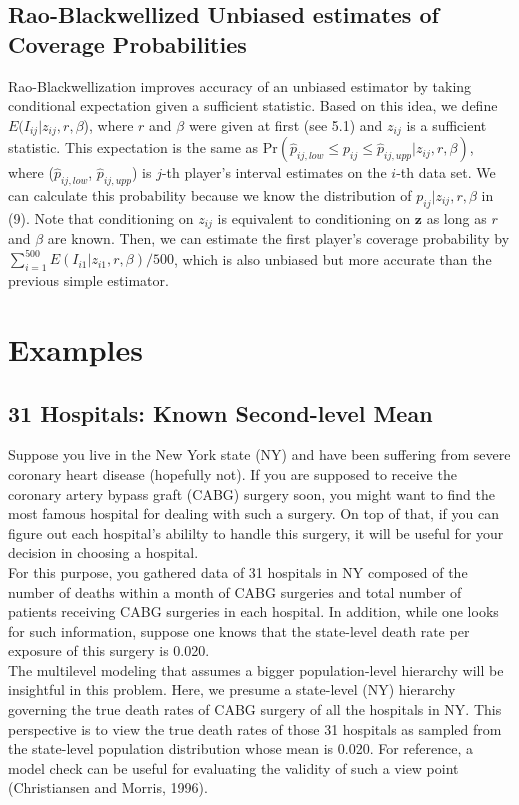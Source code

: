 \documentclass[article]{jss}
\begin{document}
\subsection{Rao-Blackwellized Unbiased estimates of Coverage Probabilities}
Rao-Blackwellization improves accuracy of an unbiased estimator by taking conditional expectation given a sufficient statistic. Based on this idea, we define $E(I_{ij}\vert z_{ij}, r, \beta$), where $r$ and $\beta$ were given at first (see 5.1) and $z_{ij}$ is a sufficient statistic. This expectation is the same as Pr$(\hat{p}_{ij, low}\le p_{ij} \le\hat{p}_{ij, upp}\vert z_{ij}, r, \beta)$, where ($\hat{p}_{ij, low}$, $\hat{p}_{ij, upp}$) is $j$-th player's interval estimates on the $i$-th data set. We can calculate this probability  because we know the distribution of $p_{ij} \vert z_{ij}, r, \beta$ in (9). Note that conditioning on $z_{ij}$ is equivalent to conditioning on $\mathbf{z}$ as long as $r$ and $\beta$ are known. Then, we can estimate the first player's coverage probability by $\sum_{i=1}^{500}E(I_{i1}\vert z_{i1}, r, \beta)/500$, which is also unbiased but more accurate than the previous simple estimator.

\section[Examples]{Examples}
\subsection[Known Second-level Mean]{31 Hospitals: Known Second-level Mean}
Suppose you live in the New York state (NY) and have been suffering from severe coronary heart disease (hopefully not). If you are supposed to receive the coronary artery bypass graft (CABG) surgery soon, you might want to find the most famous hospital for dealing with such a surgery. On top of that, if you can figure out each hospital's abililty to handle this surgery, it will be useful for your decision in choosing a hospital.
\\

For this purpose, you gathered data of 31 hospitals in NY composed of the number of deaths within a month of CABG surgeries and total number of patients receiving CABG surgeries in each hospital. In addition, while one looks for such information, suppose one knows that the state-level death rate per exposure of this surgery is 0.020. 
\\

The multilevel modeling that assumes a bigger population-level hierarchy will be insightful in this problem. Here, we presume a state-level (NY) hierarchy governing the true death rates of CABG surgery of all the hospitals in NY. This perspective is to view the true death rates of those 31 hospitals as sampled from the state-level population distribution whose mean is 0.020. For reference, a model check can be useful for evaluating the validity of such a view point (Christiansen and Morris, 1996). 
\\
\end{document}
